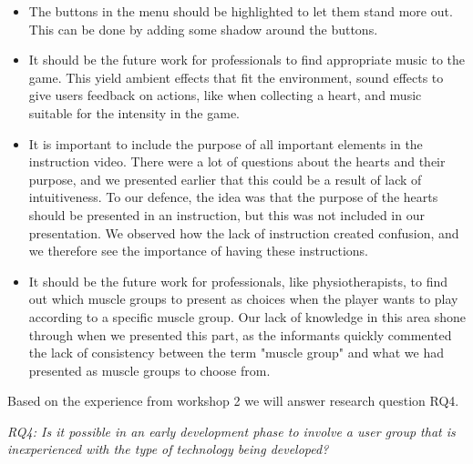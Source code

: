 \begin{itemize}
\item The buttons in the menu should be highlighted to let them stand more out. This can be done by adding some shadow around the buttons.
\item It should be the future work for professionals to find appropriate music to the game. This yield ambient effects that fit the environment, sound effects to give users feedback on actions, like when collecting a heart, and music suitable for the intensity in the game.  
\item It is important to include the purpose of all important elements in the instruction video. There were a lot of questions about the hearts and their purpose, and we presented earlier that this could be a result of lack of intuitiveness. To our defence, the idea was that the purpose of the hearts should be presented in an instruction, but this was not included in our presentation. We observed how the lack of instruction created confusion, and we therefore see the importance of having these instructions.  
\item It should be the future work for professionals, like physiotherapists, to find out which muscle groups to present as choices when the player wants to play according to a specific muscle group. Our lack of knowledge in this area shone through when we presented this part, as the informants quickly commented the lack of consistency between the term "muscle group" and what we had presented as muscle groups to choose from. 
\end{itemize}

Based on the experience from workshop 2 we will answer research question RQ4.

\emph{RQ4: Is it possible in an early development phase to involve a user group that is inexperienced with the type of technology being developed?}

